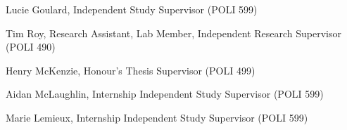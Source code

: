 {\begin{list1}
\begin{list2}
\item[2019] Lucie Goulard, Independent Study Supervisor (POLI 599)
\item[2019] Tim Roy, Research Assistant, Lab Member, Independent Research Supervisor (POLI 490)
\item[2018] Henry McKenzie, Honour's Thesis Supervisor (POLI 499)
\item[2017] Aidan McLaughlin, Internship Independent Study Supervisor (POLI 599)
\item[2017] Marie Lemieux, Internship Independent Study Supervisor (POLI 599)
\end{list2}
\end{list1}
}

\newcommand{\cvexperience}{%
{\bf National Democratic Institute of International Affairs (NDI)}, Kenya, Nepal, Ukraine, Montenegro

\vspace{-.3cm}
{\em Consultant} \hfill {\bf 2010--2024}\\
\begin{list1}
\item[]-- Provided strategic design and implementation consultancy for over one million dollars of applied political public opinion and focus group work. Wrote analytic reports.
\end{list1}

{\bf National Democratic Institute of International Affairs (NDI)}

\vspace{-.3cm}
{\em Senior Program Officer, Research and Data Analysis} \hfill {\bf 2010}\\
\begin{list1}
\item[]-- Ran NDI's USAID program to implement the first polling station level digitalized maps in Africa.
\item[]-- Initiated and oversaw NDI's Norwegian-funded qualitative and quantitative research program to investigate Kenyan citizens' attitudes towards the electoral process.
\end{list1}

{\bf Caucasus Research Resource Centers (CRRC), Eurasia Foundation}

}
